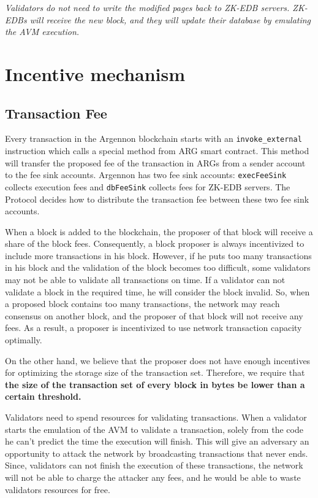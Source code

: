 \documentclass[a4paper]{report}
\begin{document}
    \emph{Validators do not need to write the modified pages back to ZK-EDB servers. ZK-EDBs will receive the new
    block, and they will update their database by emulating the AVM execution.}


    \section{Incentive mechanism}\label{sec:incentive-mechanism}

    \subsection{Transaction Fee}\label{subsec:transaction-fee}

    Every transaction in the Argennon blockchain starts with an \texttt{invoke\_external} instruction which calls a
    special method from ARG smart contract. This method will transfer the proposed fee of the transaction in ARGs
    from a sender account to the fee sink accounts. Argennon has two fee sink accounts: \texttt{execFeeSink} collects
    execution fees and \texttt{dbFeeSink} collects fees for ZK-EDB servers. The Protocol decides how to distribute the
    transaction fee between these two fee sink accounts.

    When a block is added to the blockchain, the proposer of that block will receive a share of the block fees.
    Consequently, a block proposer is always incentivized to include more transactions in his block. However, if he
    puts too many transactions in his block and the validation of the block becomes too difficult, some validators
    may not be able to validate all transactions on time. If a validator can not validate a block in the required
    time, he will consider the block invalid. So, when a proposed block contains too many transactions, the network
    may reach consensus on another block, and the proposer of that block will not receive any fees. As a result, a
    proposer is incentivized to use network transaction capacity optimally.

    On the other hand, we believe that the proposer does not have enough incentives for optimizing the storage size
    of the transaction set. Therefore, we require that \textbf{the size of the transaction set of every block in
    bytes be lower than a certain threshold.}

    Validators need to spend resources for validating transactions. When a validator starts the emulation of the AVM
    to validate a transaction, solely from the code he can't predict the time the execution will finish. This will
    give an adversary an opportunity to attack the network by broadcasting transactions that never ends. Since,
    validators can not finish the execution of these transactions, the network will not be able to charge the
    attacker any fees, and he would be able to waste validators resources for free.
\end{document}

